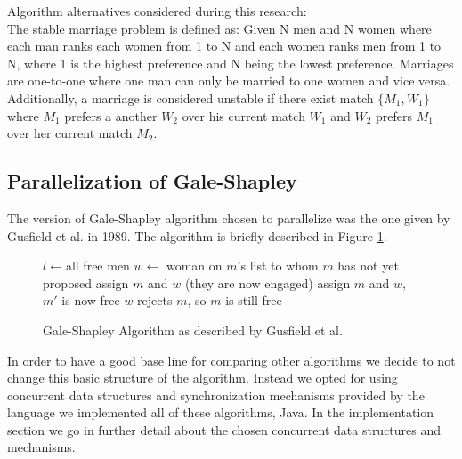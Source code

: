 Algorithm alternatives considered during this research:\\

The stable marriage problem is defined as: Given N men and N women where each man ranks each women from 1 to N and each women ranks men from 1 to N, where 1 is the highest preference and N being the lowest preference. Marriages are one-to-one where one man can only be married to one women and vice versa. Additionally, a marriage is considered unstable if there exist match $\{M_1, W_1\}$ where $M_1$ prefers a another $W_2$ over his current match $W_1$ and $W_2$ prefers $M_1$ over her current match $M_2$. 





\subsection{Parallelization of Gale-Shapley}

The version of Gale-Shapley algorithm chosen to parallelize was the one given by Gusfield et al.\cite{Gusfield:1989:SMP:68392} in 1989. The algorithm is briefly described in Figure \ref{fig:my_label}.

\begin{figure}[h]
    
    \begin{algorithmic}
    \STATE $l \gets $all free men
        \STATE $w \gets$ woman on $m$'s list to whom $m$ has not yet proposed
            \STATE assign $m$ and $w$ (they are now engaged)
        \ELSE
                \STATE assign $m$ and $w$, $m\prime$ is now free
            \ELSE
                \STATE $w$ rejects $m$, so $m$ is still free
            \ENDIF
        \ENDIF
    \ENDWHILE
    \end{algorithmic}

    \caption{Gale-Shapley Algorithm as described by Gusfield et al.}
    \label{fig:my_label}
\end{figure}

In order to have a good base line for comparing other algorithms we decide to not change this basic structure of the algorithm. Instead we opted for using concurrent data structures and synchronization mechanisms provided by the language we implemented all of these algorithms, Java. In the implementation section we go in further detail about the chosen concurrent data structures and mechanisms.

